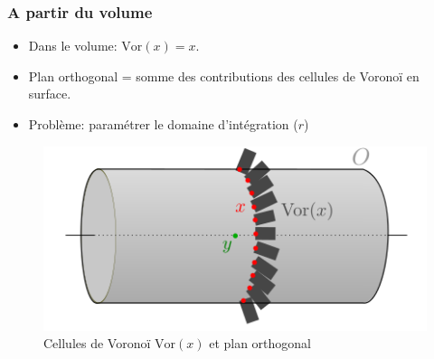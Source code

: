 \documentclass{beamer}
\begin{document}
\begin{frame}
	\frametitle{A partir du volume}
	\begin{itemize}
		
		\item Dans le volume: $\text{Vor}(x) = x$.
		\item Plan orthogonal = somme des contributions des cellules de Voronoï en surface.
		\item Problème: paramétrer le domaine d'intégration ($r$)
	\end{itemize}
	\begin{figure}
		\includegraphics[clip, trim=0 0cm 0 3 cm, scale=0.35]{fig/cylindercone.png}
		\caption{Cellules de Voronoï $\text{Vor}(x)$ et plan orthogonal}
	\end{figure}
\end{frame}
\end{document}
